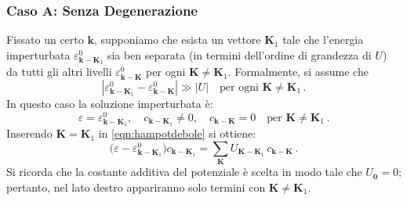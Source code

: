 \subsubsection{Caso A: Senza Degenerazione}

Fissato un certo \(\mathbf{k}\), supponiamo che esista un vettore \(\mathbf{K}_1\) tale che l'energia imperturbata \(\varepsilon^0_{\mathbf{k}-\mathbf{K}_1}\) sia ben separata (in termini dell'ordine di grandezza di \(U\)) da tutti gli altri livelli \(\varepsilon^0_{\mathbf{k}-\mathbf{K}}\) per ogni \(\mathbf{K} \neq \mathbf{K}_1\).  
Formalmente, si assume che
\begin{equation}
|\varepsilon^0_{\mathbf{k}-\mathbf{K}_1} - \varepsilon^0_{\mathbf{k}-\mathbf{K}}| \gg |U| \quad \text{per ogni } \mathbf{K} \neq \mathbf{K}_1\,.
\label{eqn:casoA}
\end{equation}
In questo caso la soluzione imperturbata è:
\[
\varepsilon = \varepsilon^0_{\mathbf{k}-\mathbf{K}_1}, \quad c_{\mathbf{k}-\mathbf{K}_1} \neq 0, \quad c_{\mathbf{k}-\mathbf{K}} = 0 \quad \text{per } \mathbf{K} \neq \mathbf{K}_1\,.
\]
Inserendo \( \mathbf{K} = \mathbf{K}_1 \) in \eqref{eqn:hampotdebole} si ottiene:
\begin{equation}
\bigl(\varepsilon - \varepsilon^0_{\mathbf{k}-\mathbf{K}_1}\bigr)c_{\mathbf{k}-\mathbf{K}_1} = \sum_{\mathbf{K}} U_{\mathbf{K} - \mathbf{K}_1} \, c_{\mathbf{k}-\mathbf{K}}\,.
\label{eqn:eq1}
\end{equation}
Si ricorda che la costante additiva del potenziale è scelta in modo tale che \(U_{\mathbf{0}} = 0\); pertanto, nel lato destro appariranno solo termini con \(\mathbf{K} \neq \mathbf{K}_1\).

